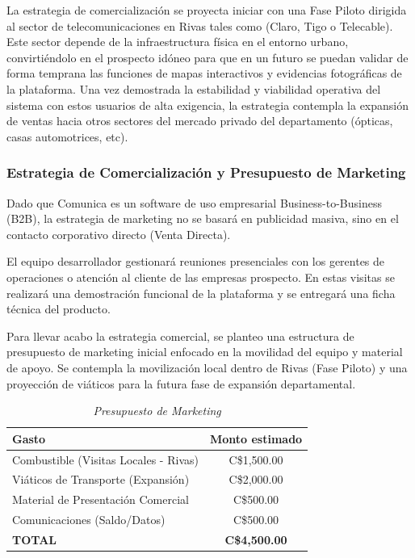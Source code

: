 La estrategia de comercialización se proyecta iniciar con una Fase Piloto dirigida al sector de telecomunicaciones en Rivas tales como (Claro, Tigo o Telecable). Este sector depende de la infraestructura física en el entorno urbano, convirtiéndolo en el prospecto idóneo para que en un futuro se puedan validar de forma temprana las funciones de mapas interactivos y evidencias fotográficas de la plataforma. Una vez demostrada la estabilidad y viabilidad operativa del sistema con estos usuarios de alta exigencia, la estrategia contempla la expansión de ventas hacia otros sectores del mercado privado del departamento (ópticas, casas automotrices, etc).

\subsubsection{Estrategia de Comercialización y Presupuesto de Marketing}
Dado que Comunica es un software de uso empresarial Business-to-Business (B2B), la estrategia de marketing no se basará en publicidad masiva, sino en el contacto corporativo directo (Venta Directa).

El equipo desarrollador gestionará reuniones presenciales con los gerentes de operaciones o atención al cliente de las empresas prospecto. En estas visitas se realizará una demostración funcional de la plataforma y se entregará una ficha técnica del producto.

Para llevar acabo la estrategia comercial, se planteo una estructura de presupuesto de marketing inicial enfocado en la movilidad del equipo y material de apoyo. Se contempla la movilización local dentro de Rivas (Fase Piloto) y una proyección de viáticos para la futura fase de expansión departamental.

\begin{table}[htbp]
	\centering
	\caption{\emph{Presupuesto de Marketing}}
	\label{tab:presupuesto_marketing}
	\begin{tabularx}{\textwidth}{X c}
		\toprule
		\textbf{Gasto} & \textbf{Monto estimado} \\
		\midrule
		Combustible (Visitas Locales - Rivas) & C\$1,500.00 \\
		Viáticos de Transporte (Expansión) & C\$2,000.00 \\
		Material de Presentación Comercial & C\$500.00 \\
		Comunicaciones (Saldo/Datos) & C\$500.00 \\
		\midrule
		\textbf{TOTAL} & \textbf{C\$4,500.00} \\
		\bottomrule
	\end{tabularx}
\end{table}

